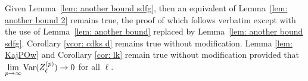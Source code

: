 Given Lemma~\ref{lem: another bound sdfg}, then an equivalent of Lemma~\ref{lem: another bound 2} remains true, the proof of which follows verbatim except with the use of Lemma~\ref{lem: another bound} replaced by Lemma~\ref{lem: another bound sdfg}. Corollary \ref{vcor: cdks d} remains true without modification. Lemma \ref{lem: KajPOw} and Corollary \ref{cor: lk} remain true without modification provided that \(\lim\limits_{p\to\infty}\mathrm{Var}(Z_\ell^{(p)})\to 0\) for all \(\ell\). 

































